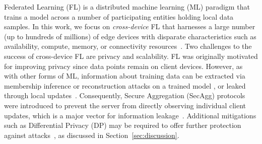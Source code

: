 \documentclass[11pt]{article}
\newcommand{\SecAgg}{{\sc SecAgg}\xspace}
\begin{document}
Federated Learning (FL) is a distributed machine learning (ML) paradigm that trains a model across a number of participating entities holding local data samples.
In this work, we focus on \emph{cross-device} FL that harnesses a large number (up to hundreds of millions) of edge devices with disparate characteristics such as availability, compute, memory, or connectivity
resources~\cite{Graham-kairouz2019advances}. %
Two challenges to the success of cross-device FL are privacy and scalability.
FL was originally motivated for improving privacy since data points remain on client devices.
However, as with other forms of ML, information about training data can be extracted via membership inference or reconstruction attacks on a trained model \cite{Graham-carlini2021membership,Graham-carlini2020extracting}, or leaked through local updates~\cite{Graham-MelisSCS19,Graham-geiping2020inverting}.
Consequently, Secure Aggregation (\SecAgg) protocols were introduced to prevent the server from directly observing individual client updates, which is a major vector for information leakage~\cite{Graham-bonavitz2019federated,Graham-huba2021papaya}.
Additional mitigations such as  Differential Privacy (DP) may be required to offer further protection
against attacks~\cite{Graham-dwork2006calibrating,Graham-abadi2016deep}, as discussed in Section~\ref{sec:discussion}.
\end{document}

